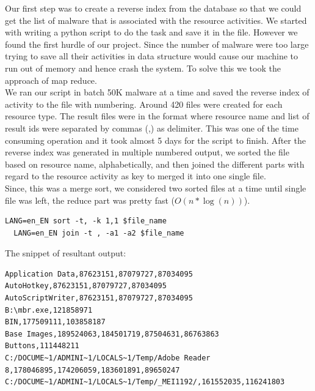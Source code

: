 Our first step was to create a reverse index from the database so that we could get the list of malware that is associated with the resource activities.
We started with writing a python script to do the task and save it in the file.
However we found the first hurdle of our project.
Since the number of malware were too large trying to save all their activities in data structure would cause our machine to run out of memory and hence crash the system.
To solve this we took the approach of map reduce.\\
We ran our script in batch 50K malware at a time and saved the reverse index of activity to the file with numbering.
Around 420 files were created for each resource type. The result files were in the format where resource name and list of result ids were separated by commas (,) as delimiter.
This was one of the time consuming operation and it took almost 5 days for the script to finish. After the reverse index was generated in multiple numbered output, we sorted the file based on resource name, alphabetically, and then joined the different parts with regard to the resource activity as key to merged it into one single file.\\
Since, this was a merge sort, we considered two sorted files at a time until single file was left, the reduce part was pretty fast ($O( n * \log(n))$).

\begin{lstlisting}[numbers=none]
  LANG=en_EN sort -t, -k 1,1 $file_name
  LANG=en_EN join -t , -a1 -a2 $file_name
\end{lstlisting}
The snippet of resultant output:
\begin{lstlisting}[numbers=none]
Application Data,87623151,87079727,87034095
AutoHotkey,87623151,87079727,87034095
AutoScriptWriter,87623151,87079727,87034095
B:\mbr.exe,121858971
BIN,177509111,103858187
Base Images,189524063,184501719,87504631,86763863
Buttons,111448211
C:/DOCUME~1/ADMINI~1/LOCALS~1/Temp/Adobe Reader 8,178046895,174206059,183601891,89650247
C:/DOCUME~1/ADMINI~1/LOCALS~1/Temp/_MEI1192/,161552035,116241803
\end{lstlisting}

